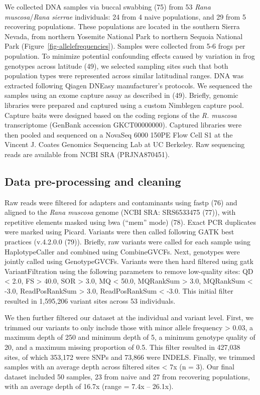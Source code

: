 \documentclass[9pt,twocolumn,twoside,lineno]{pnas-new}
\begin{document}
{We collected DNA samples via buccal swabbing (75) from 53 \emph{Rana
muscosa}/\emph{Rana sierrae} individuals: 24 from 4 naive populations,
and 29 from 5 recovering populations. These populations are located in
the southern Sierra Nevada, from northern Yosemite National Park to
northern Sequoia National Park (Figure~\ref{fig-allelefrequencies}).
Samples were collected from 5-6 frogs per population. To minimize
potential confounding effects caused by variation in frog genotypes
across latitude (49), we selected sampling sites such that both
population types were represented across similar latitudinal ranges. DNA
was extracted following Qiagen DNEasy manufacturer's protocols. We
sequenced the samples using an exome capture assay as described in (49).
Briefly, genomic libraries were prepared and captured using a custom
Nimblegen capture pool. Capture baits were designed based on the coding
regions of the \emph{R. muscosa} transcriptome (GenBank accession
GKCT00000000). Captured libraries were then pooled and sequenced on a
NovaSeq 6000 150PE Flow Cell S1 at the Vincent J. Coates Genomics
Sequencing Lab at UC Berkeley. Raw sequencing reads are available from
NCBI SRA (PRJNA870451).

\hypertarget{data-pre-processing-and-cleaning}{%
\subsection*{Data pre-processing and
cleaning}\label{data-pre-processing-and-cleaning}}

Raw reads were filtered for adapters and contaminants using fastp (76)
and aligned to the \emph{Rana muscosa} genome (NCBI SRA: SRS6533475
(77)), with repetitive elements masked using bwa (``mem'' mode) (78).
Exact PCR duplicates were marked using Picard. Variants were then called
following GATK best practices (v.4.2.0.0 (79)). Briefly, raw variants
were called for each sample using HaplotypeCaller and combined using
CombineGVCFs. Next, genotypes were jointly called using GenotypeGVCFs.
Variants were then hard filtered using gatk VariantFiltration using the
following parameters to remove low-quality sites: QD \textless{} 2.0, FS
\textgreater{} 40.0, SOR \textgreater{} 3.0, MQ \textless{} 50.0,
MQRankSum \textgreater{} 3.0, MQRankSum \textless{} -3.0, ReadPosRankSum
\textgreater{} 3.0, ReadPosRankSum \textless{} -3.0. This initial filter
resulted in 1,595,206 variant sites across 53 individuals.

We then further filtered our dataset at the individual and variant
level. First, we trimmed our variants to only include those with minor
allele frequency \textgreater{} 0.03, a maximum depth of 250 and minimum
depth of 5, a minimum genotype quality of 20, and a maximum missing
proportion of 0.5. This filter resulted in 427,038 sites, of which
353,172 were SNPs and 73,866 were INDELS. Finally, we trimmed samples
with an average depth across filtered sites \textless{} 7x (n = 3). Our
final dataset included 50 samples, 23 from naive and 27 from recovering
populations, with an average depth of 16.7x (range = 7.4x -- 26.1x).

}
\end{document}
